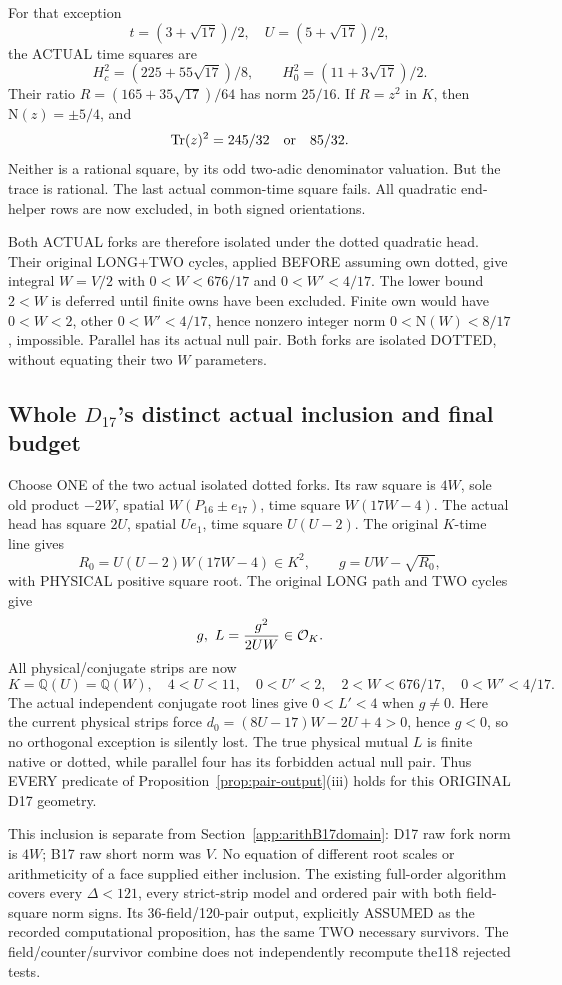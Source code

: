 For that exception
\[
 t=(3+\sqrt{17})/2,\quad U=(5+\sqrt{17})/2,
\]
the ACTUAL time squares are
\[
 H_c^2=(225+55\sqrt{17})/8,\qquad
 H_0^2=(11+3\sqrt{17})/2 .
\]
Their ratio
\(R=(165+35\sqrt{17})/64\) has norm \(25/16\).
If \(R=z^2\) in \(K\), then
\(\mathrm N(z)=\pm5/4\), and
\[
                    \operatorname{Tr}(z)^2=245/32
                                      \quad\hbox{or}\quad85/32 .
\]
Neither is a rational square, by its odd
two-adic denominator valuation.
But the trace is rational.
The last actual common-time square fails.
All quadratic end-helper rows are now excluded,
in both signed orientations.

Both ACTUAL forks are therefore isolated under
the dotted quadratic head.
Their original LONG+TWO cycles, applied BEFORE
assuming own dotted, give integral \(W=V/2\)
with \(0<W<676/17\) and \(0<W'<4/17\).
The lower bound \(2<W\) is deferred until
finite owns have been excluded.
Finite own would have \(0<W<2\), other
\(0<W'<4/17\), hence nonzero integer norm
\(0<\mathrm N(W)<8/17\), impossible.
Parallel has its actual null pair.
Both forks are isolated DOTTED, without
equating their two \(W\) parameters.

\subsection{Whole \(D_{17}\)'s distinct actual inclusion and final budget}
\label{app:arithD17domain}

Choose ONE of the two actual isolated dotted forks.
Its raw square is \(4W\), sole old product
\(-2W\), spatial \(W(P_{16}\pm e_{17})\),
time square \(W(17W-4)\).
The actual head has square \(2U\), spatial
\(Ue_1\), time square \(U(U-2)\).
The original \(K\)-time line gives
\[
 R_0=U(U-2)W(17W-4)\in K^2,\qquad
 g=UW-\sqrt{R_0},
\]
with PHYSICAL positive square root.
The original LONG path and TWO cycles give
\[
                   g,\ L={g^2\over2UW}\in\mathcal O_K .
\]
All physical/conjugate strips are now
\[
 K=\mathbb Q(U)=\mathbb Q(W),\quad
 4<U<11,\quad0<U'<2,\quad
 2<W<676/17,\quad0<W'<4/17 .
\]
The actual independent conjugate root lines give
\(0<L'<4\) when \(g\ne0\).
Here the current physical strips force
\(d_0=(8U-17)W-2U+4>0\), hence \(g<0\),
so no orthogonal exception is silently lost.
The true physical mutual \(L\) is finite
native or dotted, while parallel four has
its forbidden actual null pair.
Thus EVERY predicate of
Proposition~\ref{prop:pair-output}(iii) holds
for this ORIGINAL D17 geometry.

This inclusion is separate from
Section~\ref{app:arithB17domain}:
D17 raw fork norm is \(4W\);
B17 raw short norm was \(V\).
No equation of different root scales or
arithmeticity of a face supplied either inclusion.
The existing full-order algorithm covers every
\(\Delta<121\), every strict-strip model and
ordered pair with both field-square norm signs.
Its 36-field/120-pair output, explicitly ASSUMED
as the recorded computational proposition, has
the same TWO necessary survivors.
The field/counter/survivor combine does not
independently recompute the118 rejected tests.

